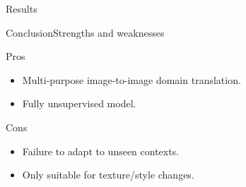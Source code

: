 \documentclass[10pt]{beamer}
\begin{document}
\begin{frame}{Results}

\end{frame}

\begin{frame}{Conclusion}{Strengths and weaknesses}
\begin{block}{Pros}
\begin{itemize}
\item Multi-purpose image-to-image domain translation.
\item Fully unsupervised model.
\end{itemize}
\end{block}

\begin{block}{Cons}
\begin{itemize}
\item Failure to adapt to unseen contexts.
\item Only suitable for texture/style changes.
\end{itemize}
\end{block}
\end{frame}
\end{document}
